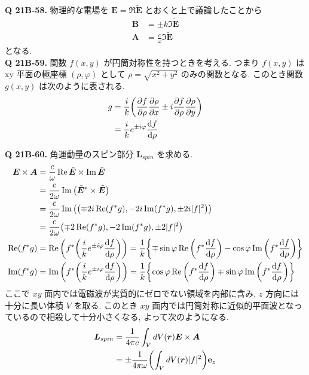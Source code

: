 \documentclass[uplatex,dvipdfmx,a4paper,11pt]{jlreq}
\newcommand{\EE}{\bm{E}}
\newcommand{\BB}{\bm{B}}
\renewcommand{\AA}{\bm{A}}
\newcommand{\rr}{\bm{r}}
\newcommand{\ET}{\tilde{\bm{E}}}
\newcommand{\LL}{\bm{L}}
\theoremstyle{definition}
\begin{document}
\textbf{Q 21B-58.}
物理的な電場を $\EE = \Re\ET$ とおくと上で議論したことから
\begin{align}
  \BB & = \pm k\Im\ET \label{B tilde E} \\
  \AA & = \frac{c}{\omega}\Im\ET
\end{align}
となる. \\

\textbf{Q 21B-59.}
関数 $f(x,y)$ が円筒対称性を持つときを考える. つまり $f(x,y)$ は xy 平面の極座標 $(\rho, \varphi)$ として $\rho=\sqrt{x^2 + y^2}$ のみの関数となる. このとき関数 $g(x,y)$ は次のように表される.
\begin{align}
  g & = \frac{i}{k}\qty(\pdv{f}{\rho}\pdv{\rho}{x}\pm i\pdv{f}{\rho}\pdv{\rho}{y}) \\
    & = \frac{i}{k}e^{\pm i\varphi}\dv{f}{\rho} \label{def g}
\end{align}

\textbf{Q 21B-60.}
角運動量のスピン部分 $\LL_{spin}$ を求める.
\begin{align}
  \EE \times \AA & = \frac{c}{\omega}\Re\ET\times\Im\ET                                                                                                                        \\
                 & = \frac{c}{2\omega}\Im\qty(\ET^*\times\ET)                                                                                                                  \\
                 & = \frac{c}{2\omega}\Im\qty(\qty(\mp 2i\Re(f^*g), -2i\Im(f^*g), \pm 2i|f|^2))                                                                                \\
                 & = \frac{c}{2\omega}\qty(\mp 2\Re(f^*g), -2\Im(f^*g), \pm 2|f|^2)                                                                                            \\
  \Re(f^*g)      & = \Re\qty(f^*\qty(\frac{i}{k}e^{\pm i\varphi}\dv{f}{\rho})) = \frac{1}{k}\qty{\mp\sin\varphi\Re\qty(f^*\dv{f}{\rho}) - \cos\varphi\Im\qty(f^*\dv{f}{\rho})} \\
  \Im(f^*g)      & = \Im\qty(f^*\qty(\frac{i}{k}e^{\pm i\varphi}\dv{f}{\rho})) = \frac{1}{k}\qty{\cos\varphi\Re\qty(f^*\dv{f}{\rho}) \mp \sin\varphi\Im\qty(f^*\dv{f}{\rho})}
\end{align}
ここで $xy$ 面内では電磁波が実質的にゼロでない領域を内部に含み, $z$ 方向には十分に長い体積 $V$ を取る. このとき $xy$ 面内では円筒対称に近似的平面波となっているので相殺して十分小さくなる, よって次のようになる.
\begin{align}
  \LL_{spin} & = \frac{1}{4\pi c}\int_V dV(\rr)\EE\times\AA               \\
             & = \pm\frac{1}{4\pi\omega}\qty(\int_V dV(\rr)|f|^2)\vb{e}_z
\end{align}
\end{document}
